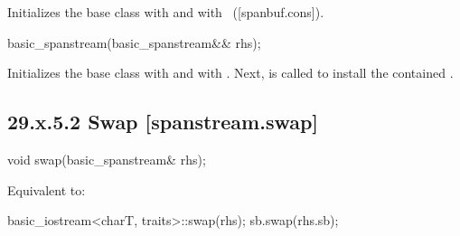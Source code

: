 \documentclass[ebook,11pt,article]{memoir}
\renewcommand{\iref}[1]{[#1]}
\begin{document}
\begin{itemdescr}
\pnum
\effects
Initializes the base class with
and  with
~(\iref{spanbuf.cons}).
\end{itemdescr}

\begin{itemdecl}
basic_spanstream(basic_spanstream&& rhs);
\end{itemdecl}

\begin{itemdescr}
\pnum
\effects Initializes the base class with  
and  with .
Next,  is called to
install the contained .
\end{itemdescr}

\subsection{29.x.5.2 Swap [spanstream.swap]}
\label{spanstream.swap}

%

\begin{itemdecl}
void swap(basic_spanstream& rhs);
\end{itemdecl}

\begin{itemdescr}
\pnum
\effects Equivalent to:
\begin{codeblock}
    basic_iostream<charT, traits>::swap(rhs);
    sb.swap(rhs.sb);
\end{codeblock}
\end{itemdescr}
\end{document}
